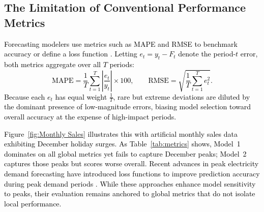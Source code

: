 \documentclass[12pt]{article}
\newcommand{\matt}[1]{\textcolor{black}{#1}}
\begin{document}

\subsection{The Limitation of Conventional Performance Metrics}
\matt{Forecasting modelers use metrics such as MAPE and RMSE to benchmark accuracy or define a loss function \citep{petropoulos2022}. Letting $e_t = y_t - F_t$ denote the period-$t$ error, both metrics aggregate over all $T$ periods: \newpage
\begin{equation}
\text{MAPE} = \frac{1}{T} \sum_{t=1}^{T} \left| \frac{e_t}{y_t} \right| \times 100,
\qquad
\text{RMSE} = \sqrt{\frac{1}{T} \sum_{t=1}^{T} e_t^2}.
\end{equation}
Because each $e_t$ %
has equal weight $\frac{1}{T}$, rare but extreme deviations are diluted by the dominant presence of low-magnitude errors, biasing model selection toward overall accuracy at the expense of high-impact periods.}

\matt{Figure~\ref{fig:Monthly Sales} illustrates this with artificial monthly sales data exhibiting December holiday surges. As Table~\ref{tab:metrics} shows, Model~1 dominates on all global metrics yet fails to capture December peaks; Model~2 captures those peaks but scores worse overall. Recent advances in peak electricity demand forecasting have introduced loss functions to improve prediction accuracy during peak demand periods \citep{nygard2025}. While these approaches enhance model sensitivity to peaks, their evaluation remains anchored to global metrics that do not isolate local performance.}
\end{document}
